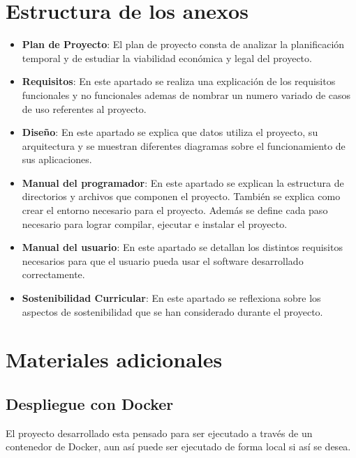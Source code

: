 \section{Estructura de los anexos}
\begin{itemize}
   \item \textbf{Plan de Proyecto}: El plan de proyecto consta de analizar la planificación temporal y de estudiar la viabilidad económica y legal del proyecto.
    \item \textbf{Requisitos}: En este apartado se realiza una explicación de los requisitos funcionales y no funcionales ademas de nombrar un numero variado de casos de uso referentes al proyecto.
    \item \textbf{Diseño}: En este apartado se explica que datos utiliza el proyecto, su arquitectura y se muestran diferentes diagramas sobre el funcionamiento de sus aplicaciones.
    \item \textbf{Manual del programador}: En este apartado se explican la estructura de directorios y archivos que componen el proyecto. También se explica como crear el entorno necesario para el proyecto. Además se define cada paso necesario para lograr compilar, ejecutar e instalar el proyecto.
    \item \textbf{Manual del usuario}: En este apartado se detallan los distintos requisitos necesarios para que el usuario pueda usar el software desarrollado correctamente.
    \item \textbf{Sostenibilidad Curricular}: En este apartado se reflexiona sobre los aspectos de sostenibilidad que se han considerado durante el proyecto.
\end{itemize}

\section{Materiales adicionales}
\subsection{Despliegue con Docker}
El proyecto desarrollado esta pensado para ser ejecutado a través de un contenedor de Docker, aun así puede ser ejecutado de forma local si así se desea.
